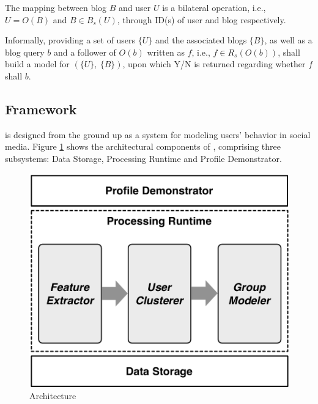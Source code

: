 The mapping between blog $B$ and user $U$ is a bilateral operation, i.e., $U = O(B)$ and $B \in B_s(U)$, through ID(s) of user and blog respectively.

Informally, providing a set of users $\{U\}$ and the associated blogs $\{B\}$, as well as a blog query $b$ and a follower of $O(b)$ written as $f$, i.e., $f \in R_s(O(b))$, \sys{} shall build a \retg{} model for $(\{U\},\ \{B\})$, upon which Y/N is returned regarding whether $f$ shall \ret{} $b$.


\subsection{\sys{} Framework}
\sys{} is designed from the ground up as a system for modeling users' \retg{} behavior in social media.
Figure \ref{fig:framework} shows the architectural components of \sys{}, comprising three subsystems: Data Storage, Processing Runtime and Profile Demonstrator.
 
\begin{figure}[!htb]
\centering
\includegraphics[width=.96\linewidth]{figures/architecture}
\caption{\sys{} Architecture}
\label{fig:framework}
\end{figure}


